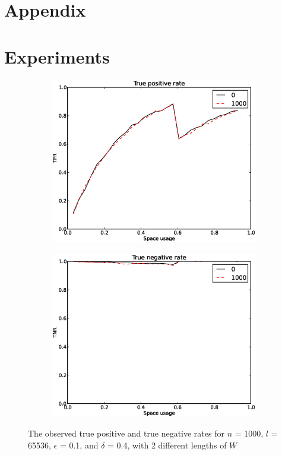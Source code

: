 \documentclass[a4paper,11pt]{article}
\begin{document}
\section*{Appendix}
\appendix
\section{Experiments}\label{appendix:experiments}
\begin{figure}[H]
\centering
\begin{subfigure}{.5\textwidth}
  \centering
  \includegraphics[width=.95\linewidth]{wildcard_1000_TPR1}
\end{subfigure}%
\begin{subfigure}{.5\textwidth}
  \centering
  \includegraphics[width=.95\linewidth]{wildcard_1000_TNR1}
\end{subfigure}
\caption{The observed true positive and true negative rates for $n$ = 1000, $l$ = 65536, $\epsilon$ = 0.1, and $\delta$ = 0.4, with 2 different lengths of $W$}
\label{fig:w-tpnr}
\end{figure}

%
\end{document}
